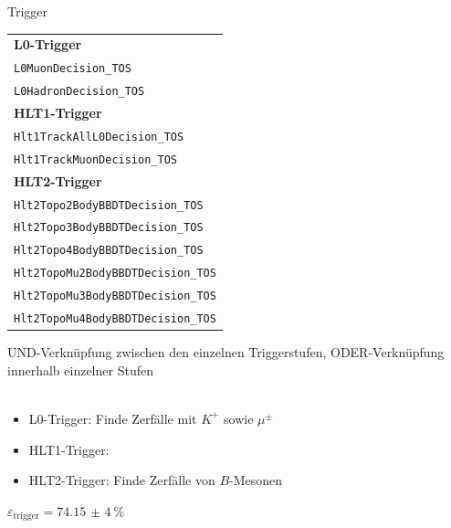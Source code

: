 \begin{frame}[t]{Trigger}
  \begin{spacing}{0.8}
    \begin{multicols}{2}
      \begin{table}[htb]
        \centering
        \begin{tabular}{l}
          \toprule
          \small{\textbf{L0-Trigger}}                                 \\
          \quad\small{\texttt{L0MuonDecision\_TOS}}              \\
          \quad\small{\texttt{L0HadronDecision\_TOS}}            \\
          \midrule
          \small{\textbf{HLT1-Trigger}}                               \\
          \quad\small{\texttt{Hlt1TrackAllL0Decision\_TOS}}      \\
          \quad\small{\texttt{Hlt1TrackMuonDecision\_TOS}}       \\
          \midrule
          \small{\textbf{HLT2-Trigger}}                               \\
          \quad\small{\texttt{Hlt2Topo2BodyBBDTDecision\_TOS}}   \\
          \quad\small{\texttt{Hlt2Topo3BodyBBDTDecision\_TOS}}   \\
          \quad\small{\texttt{Hlt2Topo4BodyBBDTDecision\_TOS}}   \\
          \quad\small{\texttt{Hlt2TopoMu2BodyBBDTDecision\_TOS}} \\
          \quad\small{\texttt{Hlt2TopoMu3BodyBBDTDecision\_TOS}} \\
          \quad\small{\texttt{Hlt2TopoMu4BodyBBDTDecision\_TOS}} \\
          \bottomrule
        \end{tabular}
      \end{table}
    \columnbreak
    UND-Verknüpfung zwischen den einzelnen Triggerstufen, ODER-Verknüpfung innerhalb einzelner Stufen
    \ \\
    \ \\
    \begin{itemize}
      \item L0-Trigger: Finde Zerfälle mit $K^+$ sowie $\mu^{\pm}$
      \item HLT1-Trigger:
      \item HLT2-Trigger: Finde Zerfälle von $B$-Mesonen
    \end{itemize}
    \begin{framed}
      \centering
      $\varepsilon_\text{trigger}=\SI{74,15(4)}{\percent}$
    \end{framed}
    \end{multicols}
  \end{spacing}
\end{frame}

